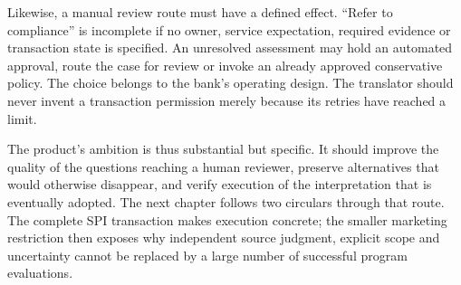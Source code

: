 Likewise, a manual review route must have a defined effect. ``Refer to compliance''
is incomplete if no owner, service expectation, required evidence or transaction
state is specified. An unresolved assessment may hold an automated approval,
route the case for review or invoke an already approved conservative policy. The
choice belongs to the bank's operating design. The translator should never
invent a transaction permission merely because its retries have reached a limit.

The product's ambition is thus substantial but specific. It should improve the
quality of the questions reaching a human reviewer, preserve alternatives that
would otherwise disappear, and verify execution of the interpretation that is
eventually adopted. The next chapter follows two circulars through that route. The complete
SPI transaction makes execution concrete; the smaller marketing restriction
then exposes why independent source judgment, explicit scope and uncertainty
cannot be replaced by a large number of successful program evaluations.

